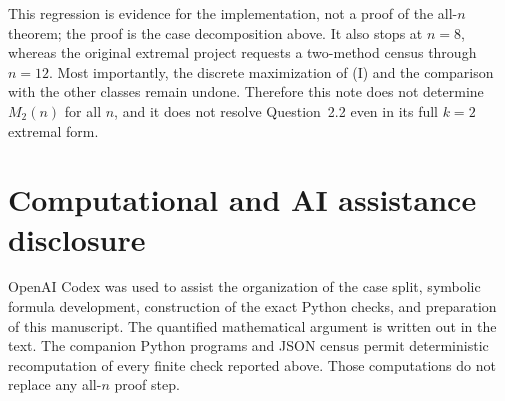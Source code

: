 \documentclass[11pt]{article}
\begin{document}
This regression is evidence for the implementation, not a proof of the
all-$n$ theorem; the proof is the case decomposition above.  It also stops at
$n=8$, whereas the original extremal project requests a two-method census
through $n=12$.  Most importantly, the discrete maximization of (I) and the
comparison with the other classes remain undone.  Therefore this note does not
determine $M_2(n)$ for all $n$, and it does not resolve Question~2.2 even in its
full $k=2$ extremal form.

\section*{Computational and AI assistance disclosure}

OpenAI Codex was used to assist the organization of the case split, symbolic
formula development, construction of the exact Python checks, and preparation
of this manuscript.  The quantified mathematical argument is written out in
the text.  The companion Python programs and JSON census permit deterministic
recomputation of every finite check reported above.  Those computations do not
replace any all-$n$ proof step.



\end{document}
